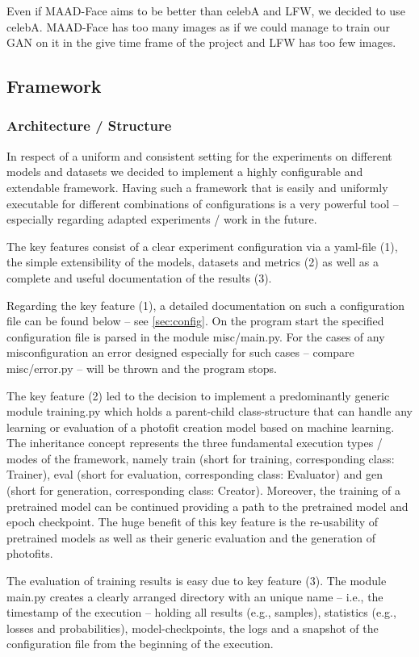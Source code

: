 \documentclass[12pt, a4paper]{article}
\begin{document}
Even if MAAD-Face aims to be better than celebA and LFW, we decided to use celebA.
MAAD-Face has too many images as if we could manage to train our GAN on it in the give time frame of the project and LFW has too few images.

\subsection{Framework}
\subsubsection{Architecture / Structure}
In respect of a uniform and consistent setting for the experiments on different models and datasets we decided to
implement a highly configurable and extendable framework.
Having such a framework that is easily and uniformly executable for different combinations of configurations is a very
powerful tool -- especially regarding adapted experiments / work in the future.

The key features consist of a clear experiment configuration via a yaml-file (1), the simple extensibility of the models,
datasets and metrics (2) as well as a complete and useful documentation of the results (3).

Regarding the key feature (1), a detailed documentation on such a configuration file can be found below --
see \ref{sec:config}.
On the program start the specified configuration file is parsed in the module misc/main.py.
For the cases of any misconfiguration an error designed especially for such cases -- compare misc/error.py -- will be
thrown and the program stops.

The key feature (2) led to the decision to implement a predominantly generic module training.py which holds a
parent-child class-structure that can handle any learning or evaluation of a photofit creation model based on machine
learning.
The inheritance concept represents the three fundamental execution types / modes of the framework, namely train
(short for training, corresponding class: Trainer), eval (short for evaluation, corresponding class: Evaluator) and gen
(short for generation, corresponding class: Creator).
Moreover, the training of a pretrained model can be continued providing a path to the pretrained model and epoch
checkpoint.
The huge benefit of this key feature is the re-usability of pretrained models as well as their generic evaluation and
the generation of photofits.

The evaluation of training results is easy due to key feature (3).
The module main.py creates a clearly arranged directory with an unique name -- i.e., the timestamp of the execution --
holding all results (e.g., samples), statistics (e.g., losses and probabilities), model-checkpoints, the logs and a
snapshot of the configuration file from the beginning of the execution.
\end{document}
